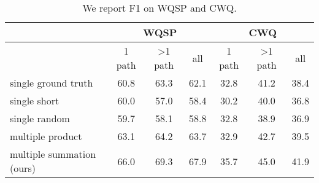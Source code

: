 \begin{table*}[h]\centering
\begin{tabular}{|l|c|c|c|c|c|c|}
\hline
                               & \multicolumn{3}{c|}{WQSP}     & \multicolumn{3}{c|}{CWQ}     \\ \hline
                               & 1 path & \textgreater{}1 path & all  & 1 path & \textgreater 1 path & all \\ \hline
single ground truth         & 60.8   & 63.3      & 62.1 &     32.8      &    41.2& 38.4               \\ 
single short  & 60.0    & 57.0        &58.4&       30.2       & 40.0       &    36.8                 \\ 
single random &  59.7      &  58.1       &58.8&      32.8       &  38.9      &  36.9                   \\ 
multiple product &    63.1    &   64.2      &63.7&     32.9        & 42.7       & 39.5                    \\ 
multiple summation (ours)      & 66.0   & 69.3        &67.9&35.7        & 45.0  & 41.9                \\ \hline
\end{tabular}
\caption{\fontsize{10}{12}\selectfont We report F1 on WQSP and CWQ.}\label{tab:wqsp_cwq_path_break}
\end{table*}


